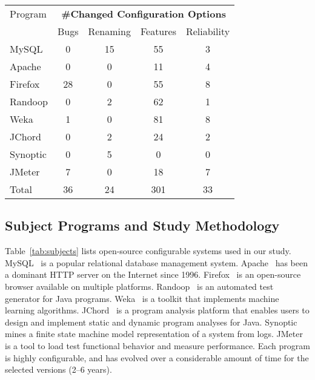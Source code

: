 \begin{table}[t]
\vspace{1mm}
\centering
\small{
\setlength{\tabcolsep}{.50\tabcolsep}
\begin{tabular}{|l|c|c|c|c|}
\hline
 Program & \multicolumn{4}{|c|}{\textbf{\#Changed Configuration Options}} \\
 \cline{2-5}
 & Bugs & Renaming & Features & Reliability \\
 \hline
 \hline
 MySQL & 0 & 15 & 55 & 3 \\
 Apache& 0 & 0 & 11 & 4 \\
 Firefox& 28 & 0 & 55 & 8 \\
 Randoop & 0  & 2 & 62  & 1\\
 Weka & 1  & 0 & 81  & 8 \\
 JChord & 0  & 2 & 24 & 2\\ %
 Synoptic & 0 &  5 & 0 & 0\\
 JMeter & 7  & 0 & 18 & 7 \\
\hline
\hline
 Total & 36 & 24 & 301 & 33 \\
\hline
\end{tabular}
}
\vspace{-2mm}
\end{table}


\subsection{Subject Programs and Study Methodology}


Table~\ref{tab:subjects} lists
\studysubjnum open-source configurable systems used in our
study.
MySQL~\cite{mysql}  is a popular relational database management
system. Apache~\cite{apache} has been a dominant
HTTP server on the Internet since 1996. Firefox~\cite{firefox}
is an open-source browser available on multiple platforms.
Randoop~\cite{randoop} is an automated test generator for Java
programs. Weka~\cite{weka} is a toolkit that implements machine
learning algorithms. JChord~\cite{jchord} is a program analysis platform that
enables users to design and implement static and
dynamic program analyses for Java. Synoptic~\cite{synoptic} mines a
finite state machine model representation of a system from
logs. JMeter~\cite{jmeter} is a tool to load test functional
behavior and measure performance.
Each program is highly configurable, and has evolved over
a considerable amount of time for the selected versions ({2--6} years).


